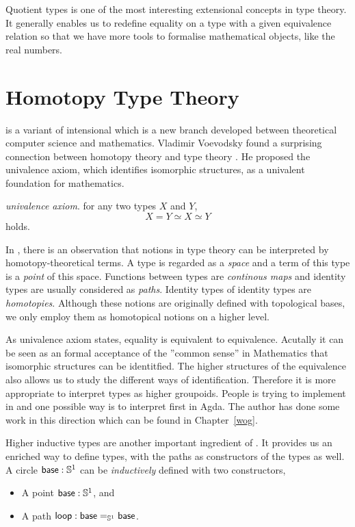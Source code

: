 Quotient types is one of the most interesting extensional concepts in type theory. It generally enables us to redefine equality on a type with a given equivalence relation so that we have more tools to formalise mathematical objects, like the real numbers.


\section{Homotopy Type Theory}

\hott is a variant of intensional \mltt{} which is a new branch developed between theoretical computer science
and mathematics. Vladimir Voevodsky found a surprising connection between homotopy theory and type theory \cite{voe:06}. He proposed the univalence axiom, which identifies isomorphic structures, as a univalent foundation for mathematics. 

\begin{definition}
\emph{univalence axiom}. for any two types $X$ and $Y$, 
$$X = Y \simeq X \simeq Y$$ holds.
\end{definition}

In \hott, there is an observation that notions in type theory can be interpreted by homotopy-theoretical terms. A type is regarded as a \emph{space} and a term of this type is a \emph{point} of this space. Functions between types are \emph{continous maps} and identity types are usually considered as \emph{paths}. Identity types of identity types are \emph{homotopies}. Although these notions are originally defined with topological bases, we only employ them as homotopical notions on a higher level. 

As univalence axiom states, equality is equivalent to equivalence. Acutally it can be seen as an formal acceptance of the ''common sense'' in Mathematics that isomorphic structures can be identitfied. The higher structures of the equivalence also allows us to study the different ways of identification. Therefore it is more appropriate to interpret types as higher groupoids. People is trying to implement \hott in \itt and one possible way is to interpret \wog first in Agda. The author has done some work in this direction which can be found in Chapter~\ref{wog}.

Higher inductive types are another important ingredient of \hott. It provides us an enriched way to define types, with the paths as constructors of the types as well. 
A circle $\base:\Sn^1$ can be \emph{inductively} defined with two constructors,
\begin{itemize}
\item A point $\base:\Sn^1$, and
\item A path $\lloop : {\id[\Sn^1]\base\base}$.
\end{itemize}

